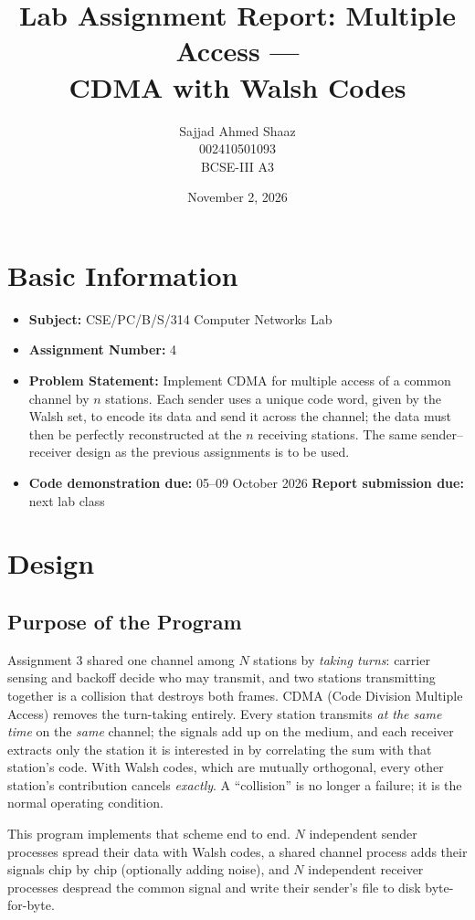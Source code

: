 \documentclass[11pt]{article}
\title{\Large\textbf{Lab Assignment Report: Multiple Access ---\\ CDMA with Walsh Codes}}
\author{Sajjad Ahmed Shaaz \\ 002410501093 \\ BCSE-III A3}
\date{November 2, 2026}
\begin{document}
\maketitle

\section*{Basic Information}
\begin{itemize}[leftmargin=1.6em]
  \item \textbf{Subject:} CSE/PC/B/S/314 Computer Networks Lab
  \item \textbf{Assignment Number:} 4
  \item \textbf{Problem Statement:} Implement CDMA for multiple access of a common channel
  by $n$ stations. Each sender uses a unique code word, given by the Walsh set, to encode its
  data and send it across the channel; the data must then be perfectly reconstructed at the
  $n$ receiving stations. The same sender--receiver design as the previous assignments is
  to be used.
  \item \textbf{Code demonstration due:} 05--09 October 2026 \quad
  \textbf{Report submission due:} next lab class
\end{itemize}

\section{Design}

\subsection{Purpose of the Program}
Assignment 3 shared one channel among $N$ stations by \emph{taking turns}: carrier sensing
and backoff decide who may transmit, and two stations transmitting together is a collision
that destroys both frames. CDMA (Code Division Multiple Access) removes the turn-taking
entirely. Every station transmits \emph{at the same time} on the \emph{same} channel; the
signals add up on the medium, and each receiver extracts only the station it is interested
in by correlating the sum with that station's code. With Walsh codes, which are mutually
orthogonal, every other station's contribution cancels \emph{exactly}. A ``collision'' is no
longer a failure; it is the normal operating condition.

This program implements that scheme end to end. $N$ independent sender processes spread
their data with Walsh codes, a shared channel process adds their signals chip by chip
(optionally adding noise), and $N$ independent receiver processes despread the common
signal and write their sender's file to disk byte-for-byte.
\end{document}
